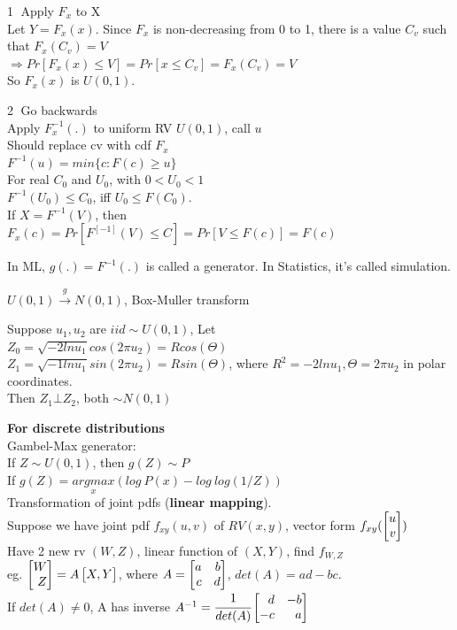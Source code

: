 \documentclass[12pt,a4paper]{article}
\begin{document}
\textcircled{1} Apply $F_x$ to X\\
Let $Y=F_x(x)$. Since $F_x$ is non-decreasing from 0 to 1, there is a value $C_v$ such that $F_x(C_v)=V$\\ 
$\Rightarrow Pr[F_x(x)\le V]=Pr[x\le C_v]=F_x(C_v)=V$\\
So $F_x(x)$ is $U(0, 1)$.

\textcircled{2} Go backwards \\
Apply $F_x^{-1}(.)$ to uniform RV $U(0,1)$, call $u$\\
Should replace cv with cdf $F_x$\\
$F^{-1}(u)=min\{c:F(c)\geq u\}$\\
For real $C_0$ and $U_0$, with $0<U_0<1$\\
$F^{-1}(U_0)\le C_0$, iff $U_0\le F(C_0)$. \\
If $X=F^{-1}(V)$, then $F_x(c)=Pr[F^[-1](V)\le C]=Pr[V\le F(c)]=F(c)$

In ML, $g(.)=F^{-1}(.)$ is called a generator. In Statistics, it's called simulation.

\vspace{0.5cm}
$U(0,1)\overset{g}{\rightarrow}N(0,1)$, Box-Muller transform

Suppose $u_1, u_2$ are $iid\sim U(0,1)$, Let\\
$Z_0=\sqrt{-2ln u_1}cos(2\pi u_2)=Rcos(\Theta)$ \\
$Z_1=\sqrt{-1ln u_1}sin(2\pi u_2)=Rsin(\Theta)$, where $R^2=-2ln u_1, \Theta=2\pi u_2$ in polar coordinates. \\
Then $Z_1\bot Z_2$, both $\sim N(0,1)$

\vspace{0.5cm}
\textbf{For discrete distributions}\\
Gambel-Max generator: \\
If $Z\sim U(0,1)$, then $g(Z)\sim P$\\
If $g(Z) = \underset{x}{argmax}(log\ P(x)-log\ log(1/Z))$\\

Transformation of joint pdfs (\textbf{linear mapping}).\\
Suppose we have joint pdf $f_{xy}(u,v)$ of $RV(x,y)$, vector form $f_{xy}(\vecb{u\\v})$ \\
Have 2 new rv $(W, Z)$, linear function of $(X,Y)$, find $f_{W,Z}$\\ 
eg. $\vecb{W\\Z}=A\vecb{X,Y}$, where $A=\vecb{a&b\\c&d}$, $det(A)=ad-bc$.\\ 
If $det(A)\neq 0$, A has inverse $A^{-1}=\cfrac{1}{det(A)}\vecb{d&-b\\-c&a}$
\end{document}
